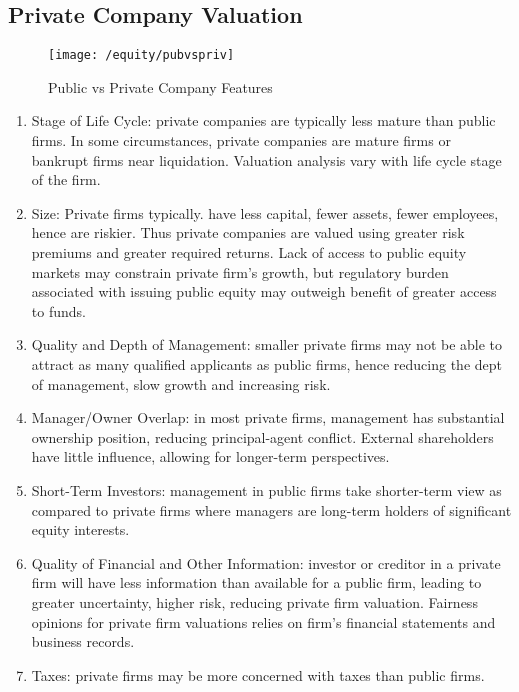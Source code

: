 \subsection{Private Company Valuation}

\begin{figure}[H]
\centering
\texttt{[image: /equity/pubvspriv]}
\caption{Public vs Private Company Features}
\end{figure}

\begin{remark} 
\begin{enumerate}[label=\roman*.]
\setlength{\itemsep}{0pt}
\item Stage of Life Cycle: private companies are typically less mature than public firms. In some circumstances, private companies are mature firms or bankrupt firms near liquidation. Valuation analysis vary with life cycle stage of the firm.
\item Size: Private firms typically. have less capital, fewer assets, fewer employees, hence are riskier. Thus private companies are valued using greater risk premiums and greater required returns. Lack of access to public equity markets may constrain private firm's growth, but regulatory burden associated with issuing public equity may outweigh benefit of greater access to funds.
\item Quality and Depth of Management: smaller private firms may not be able to attract as many qualified applicants as public firms, hence reducing the dept of management, slow growth and increasing risk.
\item Manager/Owner Overlap: in most private firms, management has substantial ownership position, reducing principal-agent conflict. External shareholders have little influence, allowing for longer-term perspectives.
\item Short-Term Investors: management in public firms take shorter-term view as compared to private firms where managers are long-term holders of significant equity interests.
\item Quality of Financial and Other Information: investor or creditor in a private firm will have less information than available for a public firm, leading to greater uncertainty, higher risk, reducing private firm valuation. Fairness opinions for private firm valuations relies on firm's financial statements and business records.
\item Taxes: private firms may be more concerned with taxes than public firms.
\end{enumerate}
\end{remark}

